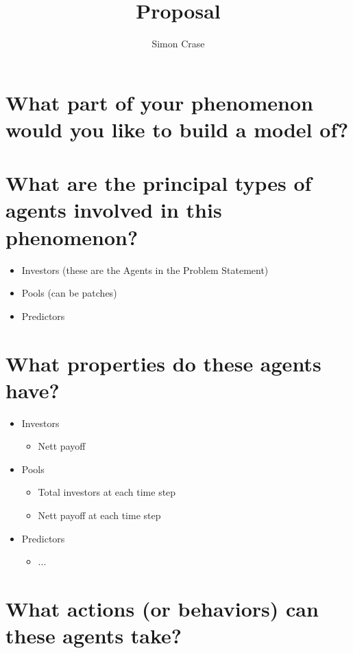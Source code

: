 \documentclass[]{article}
\title{Proposal}
\author{Simon Crase}
\begin{document}
\maketitle

\begin{abstract}

\end{abstract}


 
\section{What part of your phenomenon would you like to build a model of?}

\section{What are the principal types of agents involved in this phenomenon?}
\begin{itemize}
	\item Investors (these are the Agents in the Problem Statement)
	\item Pools (can be patches)
	\item Predictors
\end{itemize}
\section{What properties do these agents have?}
\begin{itemize}
	\item Investors
	\begin{itemize}
		\item Nett payoff
	\end{itemize}
	\item Pools
	\begin{itemize}
		\item Total investors at each time step
		\item Nett payoff at each time step
	\end{itemize}
	\item Predictors
	\begin{itemize}
		\item ...
	\end{itemize}	
\end{itemize}
\section{What actions (or behaviors) can these agents take?}
\end{document}

